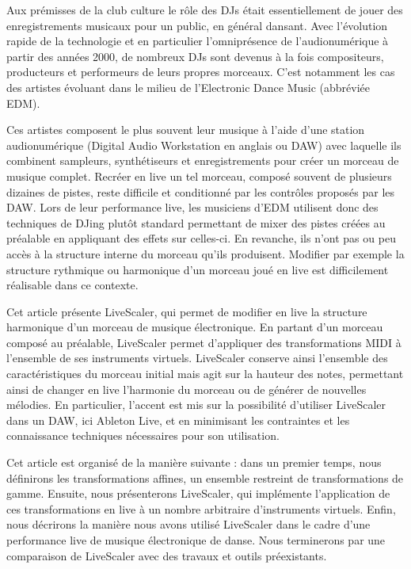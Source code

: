 Aux prémisses de la club culture le rôle des DJs était essentiellement de jouer des enregistrements musicaux pour un public, en général dansant. Avec l’évolution rapide de la technologie et en particulier l’omniprésence de l’audionumérique à partir des années 2000, de nombreux DJs sont devenus à la fois compositeurs, producteurs et performeurs de leurs propres morceaux. C'est notamment les cas des artistes évoluant dans le milieu de l'Electronic Dance Music (abbréviée EDM).

Ces artistes composent le plus souvent leur musique à l’aide d’une station audionumérique (Digital Audio Workstation en anglais ou DAW) avec laquelle ils combinent sampleurs, synthétiseurs et enregistrements pour créer un morceau de musique complet. Recréer en live un tel morceau, composé souvent de plusieurs dizaines de pistes, reste difficile et conditionné par les contrôles proposés par les DAW. Lors de leur performance live, les musiciens d’EDM utilisent donc des techniques de DJing plutôt standard  permettant de mixer des pistes créées au préalable en appliquant des effets sur celles-ci. En revanche, ils n’ont pas ou peu accès à la structure interne du morceau qu’ils produisent. Modifier par exemple la structure rythmique ou harmonique d’un morceau joué en live est difficilement réalisable dans ce contexte. 

Cet article présente LiveScaler, qui permet de modifier en live la structure harmonique d'un morceau de musique électronique. En partant d'un morceau composé au préalable, LiveScaler permet d'appliquer des transformations MIDI à l'ensemble de ses instruments virtuels. LiveScaler conserve ainsi l'ensemble des caractéristiques du morceau initial mais agit sur la hauteur des notes, permettant ainsi de changer en live l'harmonie du morceau ou de générer de nouvelles mélodies. En particulier, l'accent est mis sur la possibilité d'utiliser LiveScaler dans un DAW, ici Ableton Live, et en minimisant les contraintes et les connaissance techniques nécessaires pour son utilisation.

Cet article est organisé de la manière suivante : dans un premier temps, nous définirons les transformations affines, un ensemble restreint de transformations de gamme. Ensuite, nous présenterons LiveScaler, qui implémente l'application de ces transformations en live à un nombre arbitraire d'instruments virtuels. Enfin, nous décrirons la manière nous avons utilisé LiveScaler dans le cadre d'une performance live de musique électronique de danse. Nous terminerons par une comparaison de LiveScaler avec des travaux et outils préexistants.